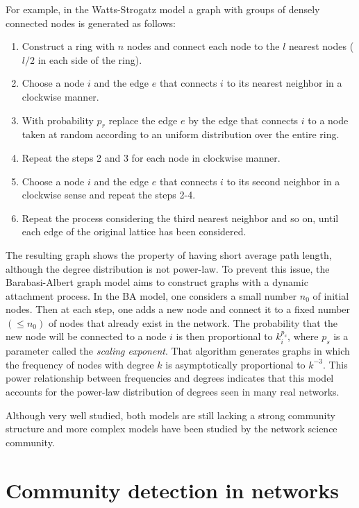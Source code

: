 For example, in the Watts-Strogatz model a graph with groups of densely connected nodes is generated as follows:
\begin{enumerate}
\item Construct a ring with $n$ nodes and connect each node to the $l$ nearest nodes ($l/2$ in each side of the ring).
\item Choose a node $i$ and the edge $e$ that connects $i$ to its nearest neighbor in a clockwise manner.
\item With probability $p_r$ replace the edge $e$ by the edge that connects $i$ to a node taken at random according to an uniform distribution over the entire ring.
\item Repeat the steps 2 and 3 for each node in clockwise manner.
\item Choose a node $i$ and the edge $e$ that connects $i$ to its second neighbor in a clockwise sense and repeat the steps 2-4.
\item Repeat the process considering the third nearest neighbor and so on, until each edge of the original lattice has been considered.
\end{enumerate}

The resulting graph shows the property of having short average path length, although the degree distribution is not power-law.
To prevent this issue, the Barabasi-Albert graph model aims to construct graphs with a dynamic attachment process.
In the BA model, one considers a small number $n_0$ of initial nodes. Then at each step, one adds a new node and connect it to a fixed number $(\leq n_0)$ of nodes that already exist in the network. The probability that the new node will be connected to a node $i$ is then proportional to $k_i^{p_s}$,  where $p_s$ is a parameter called the \emph{scaling exponent}. That algorithm generates graphs in which the frequency of nodes with degree $k$ is asymptotically proportional to ${k}^{-3}$. This power relationship between frequencies and degrees indicates that this model accounts for the power-law distribution of degrees seen in many real networks.

Although very well studied, both models are still lacking a strong community structure and more complex models have been studied by the network science community.

\section{Community detection in networks}
\label{sec:communitydetectioninnetworks}


